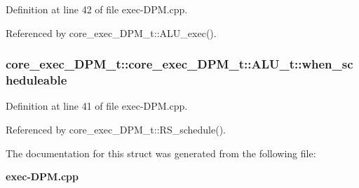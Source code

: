 Definition at line 42 of file exec-DPM.cpp.

Referenced by core\_\-exec\_\-DPM\_\-t::ALU\_\-exec().
\subsubsection[{when\_\-scheduleable}]{ core\_\-exec\_\-DPM\_\-t::core\_\-exec\_\-DPM\_\-t::ALU\_\-t::when\_\-scheduleable}\label{structcore__exec__DPM__t_1_1ALU__t_97be489796e116184c659aca796374d4}




Definition at line 41 of file exec-DPM.cpp.

Referenced by core\_\-exec\_\-DPM\_\-t::RS\_\-schedule().

The documentation for this struct was generated from the following file:\begin{CompactItemize}
\item 
{\bf exec-DPM.cpp}\end{CompactItemize}
